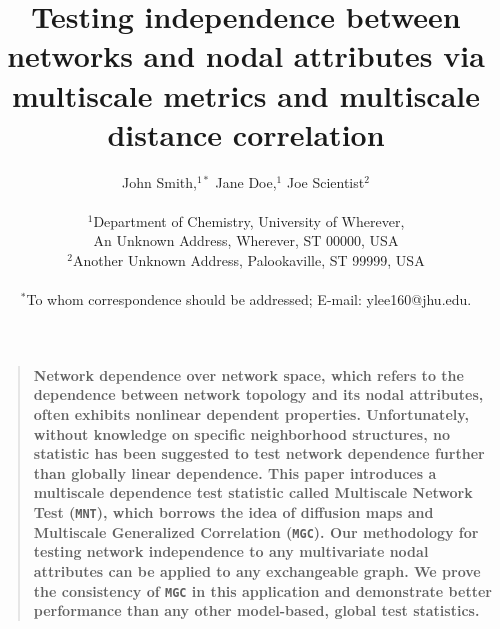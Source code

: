 \documentclass[12pt]{article}
\title{Testing independence between networks and nodal attributes via multiscale metrics and multiscale distance correlation}
\author
{John Smith,$^{1\ast}$ Jane Doe,$^{1}$ Joe Scientist$^{2}$\\
\\
\normalsize{$^{1}$Department of Chemistry, University of Wherever,}\\
\normalsize{An Unknown Address, Wherever, ST 00000, USA}\\
\normalsize{$^{2}$Another Unknown Address, Palookaville, ST 99999, USA}\\
\\
\normalsize{$^\ast$To whom correspondence should be addressed; E-mail:  ylee160@jhu.edu.}
}
\date{}
\theoremstyle{definition}
\newenvironment{sciabstract}{%
\begin{quote} \bf}
{\end{quote}}
\begin{document}
 


\baselineskip24pt
\sloppy

\maketitle 


\begin{sciabstract}
 Network dependence over network space, which refers to the dependence between network topology and its nodal attributes, often exhibits nonlinear dependent properties. Unfortunately, without knowledge on specific neighborhood structures, no statistic has been suggested to test network dependence further than globally linear dependence. This paper introduces a multiscale dependence test statistic called Multiscale Network Test (\texttt{MNT}), which borrows the idea of diffusion maps and Multiscale Generalized Correlation (\texttt{MGC}). Our methodology for testing network independence to any multivariate nodal attributes can be applied to any exchangeable graph. We prove the consistency of \texttt{MGC} in this application and demonstrate better performance than any other model-based, global test statistics. 
\end{sciabstract}

\newpage
\end{document}
